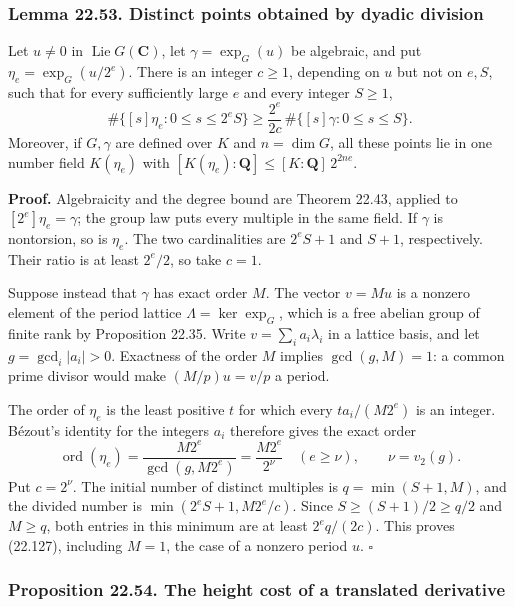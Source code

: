 \documentclass[
  11pt,
  a4paper,
]{article}
\begin{document}
\subsubsection{Lemma 22.53. Distinct points obtained by dyadic
division}\label{lemma-22.53.-distinct-points-obtained-by-dyadic-division}

Let \(u\ne0\) in \(\operatorname{Lie}G(\mathbf C)\), let
\(\gamma=\exp_G(u)\) be algebraic, and put \(\eta_e=\exp_G(u/2^e)\).
There is an integer \(c\ge1\), depending on \(u\) but not on \(e,S\),
such that for every sufficiently large \(e\) and every integer
\(S\ge1\), \[
 \#\{[s]\eta_e:0\le s\le2^e S\}
 \ge\frac{2^e}{2c}\,\#\{[s]\gamma:0\le s\le S\}.
 \tag{22.127}
\] Moreover, if \(G,\gamma\) are defined over \(K\) and \(n=\dim G\),
all these points lie in one number field \(K(\eta_e)\) with
\([K(\eta_e):\mathbf Q]\le[K:\mathbf Q]\,2^{2ne}\).

\textbf{Proof.} Algebraicity and the degree bound are Theorem 22.43,
applied to \([2^e]\eta_e=\gamma\); the group law puts every multiple in
the same field. If \(\gamma\) is nontorsion, so is \(\eta_e\). The two
cardinalities are \(2^eS+1\) and \(S+1\), respectively. Their ratio is
at least \(2^e/2\), so take \(c=1\).

Suppose instead that \(\gamma\) has exact order \(M\). The vector
\(v=Mu\) is a nonzero element of the period lattice
\(\Lambda=\ker\exp_G\), which is a free abelian group of finite rank by
Proposition 22.35. Write \(v=\sum_i a_i\lambda_i\) in a lattice basis,
and let \(g=\gcd_i|a_i|>0\). Exactness of the order \(M\) implies
\(\gcd(g,M)=1\): a common prime divisor would make \((M/p)u=v/p\) a
period.

The order of \(\eta_e\) is the least positive \(t\) for which every
\(ta_i/(M2^e)\) is an integer. Bézout's identity for the integers
\(a_i\) therefore gives the exact order \[
 \operatorname{ord}(\eta_e)
 =\frac{M2^e}{\gcd(g,M2^e)}
 =\frac{M2^e}{2^\nu}
 \quad(e\ge\nu),\qquad \nu=v_2(g).
 \tag{22.128}
\] Put \(c=2^\nu\). The initial number of distinct multiples is
\(q=\min(S+1,M)\), and the divided number is \(\min(2^eS+1,M2^e/c)\).
Since \(S\ge(S+1)/2\ge q/2\) and \(M\ge q\), both entries in this
minimum are at least \(2^e q/(2c)\). This proves (22.127), including
\(M=1\), the case of a nonzero period \(u\). \(\square\)

\subsubsection{Proposition 22.54. The height cost of a translated
derivative}\label{proposition-22.54.-the-height-cost-of-a-translated-derivative}
\end{document}

